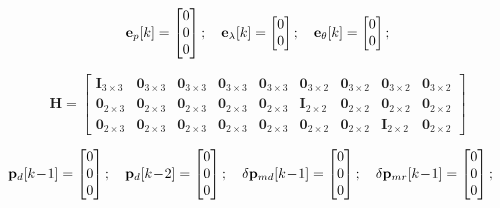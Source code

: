 \documentclass[UTF8,11pt,a4paper]{ctexart}
\begin{document}
\begin{align}
\mathbf{e}_p[k] = \begin{bmatrix}0\\0\\0\end{bmatrix};\quad
\mathbf{e}_\lambda[k] = \begin{bmatrix}0\\0\end{bmatrix};\quad
\mathbf{e}_\theta[k] = \begin{bmatrix}0\\0\end{bmatrix}; \notag
\end{align}

\[
\mathbf{H} =
\begin{bmatrix}
\mathbf{I}_{3\times3} & \mathbf{0}_{3\times3} & \mathbf{0}_{3\times3} & \mathbf{0}_{3\times3} & \mathbf{0}_{3\times3} & \mathbf{0}_{3\times2} & \mathbf{0}_{3\times2} & \mathbf{0}_{3\times2} & \mathbf{0}_{3\times2}\\
\mathbf{0}_{2\times3} & \mathbf{0}_{2\times3} & \mathbf{0}_{2\times3} & \mathbf{0}_{2\times3} & \mathbf{0}_{2\times3} & \mathbf{I}_{2\times2} & \mathbf{0}_{2\times2} & \mathbf{0}_{2\times2} & \mathbf{0}_{2\times2}\\
\mathbf{0}_{2\times3} & \mathbf{0}_{2\times3} & \mathbf{0}_{2\times3} & \mathbf{0}_{2\times3} & \mathbf{0}_{2\times3} & \mathbf{0}_{2\times2} & \mathbf{0}_{2\times2} & \mathbf{I}_{2\times2} & \mathbf{0}_{2\times2}
\end{bmatrix}
\]

\begin{align}
\mathbf{p}_d[k\!-\!1] &= \begin{bmatrix}0\\0\\0\end{bmatrix};\quad
\mathbf{p}_d[k\!-\!2] = \begin{bmatrix}0\\0\\0\end{bmatrix};\quad
{\delta}\mathbf{p}_{md}[k\!-\!1] = \begin{bmatrix}0\\0\\0\end{bmatrix};\quad
\delta\mathbf{p}_{mr}[k\!-\!1] = \begin{bmatrix}0\\0\\0\end{bmatrix}; \notag
\end{align}
\end{document}
